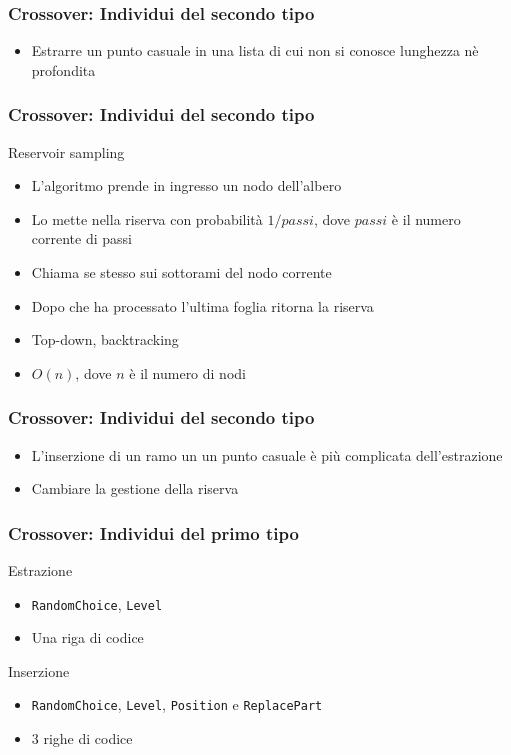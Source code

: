 \documentclass{beamer} %
\begin{document}
\begin{frame}
\frametitle{Crossover: Individui del secondo tipo}
\begin{itemize}
\item Estrarre un punto casuale in una lista di cui non si conosce lunghezza nè profondita
\end{itemize}

\end{frame}

\begin{frame}
\frametitle{Crossover: Individui del secondo tipo}
\begin{block}{Reservoir sampling}
\begin{itemize}
\item L'algoritmo prende in ingresso un nodo dell'albero
\item Lo mette nella riserva con probabilità $1/passi$, dove $passi$ è il numero corrente di passi
\item Chiama se stesso sui sottorami del nodo corrente
\item Dopo che ha processato l'ultima foglia ritorna la riserva
\item Top-down, backtracking
\item $O(n)$, dove $n$ è il numero di nodi 
\end{itemize}
\end{block}
\end{frame}

\begin{frame}
\frametitle{Crossover: Individui del secondo tipo}
\begin{itemize}
\item L'inserzione di un ramo un un punto casuale è più complicata dell'estrazione
\item Cambiare la gestione della riserva
\end{itemize}

\end{frame}

\begin{frame}
\frametitle{Crossover: Individui del primo tipo}
\begin{block}{Estrazione}

\begin{itemize}
\item \texttt{RandomChoice}, \texttt{Level}
\item Una riga di codice
\end{itemize}

\end{block}

\begin{block}{Inserzione}

\begin{itemize}
\item \texttt{RandomChoice}, \texttt{Level}, \texttt{Position} e \texttt{ReplacePart} 
\item $3$ righe  di codice
\end{itemize}

\end{block}
\end{frame}
\end{document}

